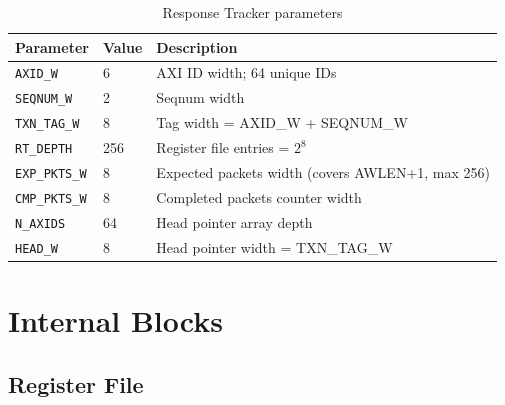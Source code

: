 \documentclass[11pt,a4paper]{article}
\begin{document}
\begin{table}[h!]
\centering
\begin{tabular}{lll}
\toprule
\textbf{Parameter} & \textbf{Value} & \textbf{Description} \\
\midrule
\texttt{AXID\_W}          & 6   & AXI ID width; 64 unique IDs \\
\texttt{SEQNUM\_W}        & 2   & Seqnum width \\
\texttt{TXN\_TAG\_W}      & 8   & Tag width = AXID\_W + SEQNUM\_W \\
\texttt{RT\_DEPTH}        & 256 & Register file entries = $2^8$ \\
\texttt{EXP\_PKTS\_W}     & 8   & Expected packets width (covers AWLEN+1, max 256) \\
\texttt{CMP\_PKTS\_W}     & 8   & Completed packets counter width \\
\texttt{N\_AXIDS}         & 64  & Head pointer array depth \\
\texttt{HEAD\_W}          & 8   & Head pointer width = TXN\_TAG\_W \\
\bottomrule
\end{tabular}
\caption{Response Tracker parameters}
\end{table}

\section{Internal Blocks}

\subsection{Register File}
\end{document}
